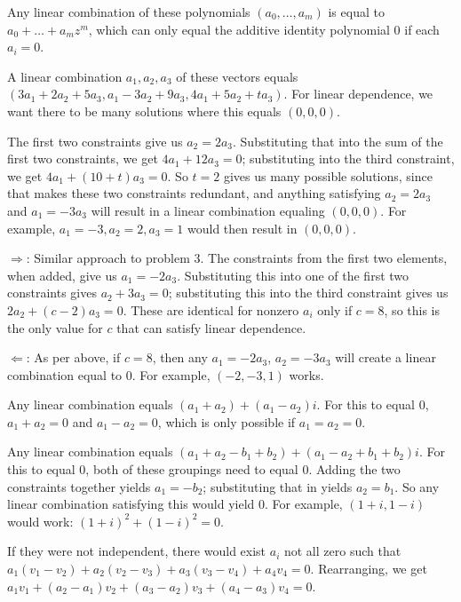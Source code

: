 \documentclass{article}
\begin{document}

Any linear combination of these polynomials $(a_0, \ldots, a_m)$ is equal to
$a_0 + \ldots + a_mz^m$, which can only equal the additive identity polynomial
$0$ if each $a_i = 0$.


A linear combination $a_1, a_2, a_3$ of these vectors equals $(3a_1 + 2a_2 +
5a_3, a_1 - 3a_2 + 9a_3, 4a_1 + 5a_2 + ta_3)$. For linear dependence, we want
there to be many solutions where this equals $(0,0,0)$.

The first two constraints give us $a_2 = 2a_3$. Substituting that into the sum
of the first two constraints, we get $4a_1 + 12a_3 = 0$; substituting into the
third constraint, we get $4a_1 + (10+t)a_3 = 0$. So $t = 2$ gives us many
possible solutions, since that makes these two constraints redundant, and
anything satisfying $a_2 = 2a_3$ and $a_1 = -3a_3$ will result in a linear
combination equaling $(0,0,0)$. For example, $a_1 = -3, a_2 = 2, a_3 = 1$ would
then result in $(0,0,0)$.


$\Rightarrow$: Similar approach to problem 3. The constraints from the first two
elements, when added, give us $a_1 = -2a_3$. Substituting this into one of the
first two constraints gives $a_2 + 3a_3 = 0$; substituting this into the third
constraint gives us $2a_2 + (c-2)a_3 = 0$. These are identical for nonzero $a_i$
only if $c = 8$, so this is the only value for $c$ that can satisfy linear
dependence.

$\Leftarrow$: As per above, if $c = 8$, then any $a_1 = -2a_3$, $a_2 = -3a_3$
will create a linear combination equal to 0. For example, $(-2,-3,1)$ works.


Any linear combination equals $(a_1 + a_2) + (a_1 - a_2)i$. For this to equal 0,
$a_1 + a_2 = 0$ and $a_1 - a_2 = 0$, which is only possible if $a_1 = a_2 = 0$.


Any linear combination equals $(a_1 + a_2 - b_1 + b_2) + (a_1 - a_2 + b_1 +
b_2)i$. For this to equal 0, both of these groupings need to equal 0. Adding the
two constraints together yields $a_1 = -b_2$; substituting that in yields $a_2 =
b_1$. So any linear combination satisfying this would yield 0. For example,
$(1+i, 1-i)$ would work: $(1+i)^2 + (1-i)^2 = 0$.


If they were not independent, there would exist $a_i$ not all zero such that
$a_1(v_1 - v_2) + a_2(v_2 - v_3) + a_3(v_3 - v_4) + a_4v_4 = 0$. Rearranging, we
get $a_1v_1 + (a_2 - a_1)v_2 + (a_3 - a_2)v_3 + (a_4 - a_3)v_4 = 0$.
\end{document}
